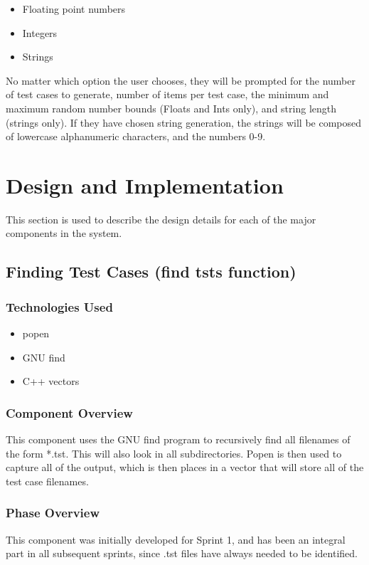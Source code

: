 \documentclass {article}
\begin{document}
	 				\begin{itemize}
	 					\item Floating point numbers
	 					\item Integers
	 					\item Strings
	 				\end{itemize}
	 				
	 				No matter which option the user chooses, they will be prompted for the number
	 				 of test cases to generate, number of items per test case,
	 				 the minimum and maximum random number bounds
	 				 (Floats and Ints only), and string length (strings only). If they have chosen
	 				 string generation, the strings will be composed of lowercase alphanumeric
	 				 characters, and the numbers 0-9.
	 				 
	\newpage
	 	
	\section{\LARGE{\color{blue}Design and Implementation}}
		This section is used to describe the design details for each of the major components 
		 in the system.
		 
		\subsection{\Large{\color{blue}Finding Test Cases (find tsts function)}}
			\subsubsection{\large{\color{cyan}Technologies Used}}
				\begin{itemize}
   					\item popen
    				\item GNU find
    				\item C++ vectors
				\end{itemize}
				
			\subsubsection{\large{\color{cyan}Component Overview}}
				This component uses the GNU find program to recursively find all filenames of the
				 form *.tst. This will also look in all subdirectories. Popen is then used to
				 capture all of the output, which is then places in a vector that will store all
				 of the test case filenames.
				 
			\subsubsection{\large{\color{cyan}Phase Overview}}
				This component was initially developed for Sprint 1, and has been an integral part
				 in all subsequent sprints, since .tst files have always needed to be identified.
				 
\end{document}

